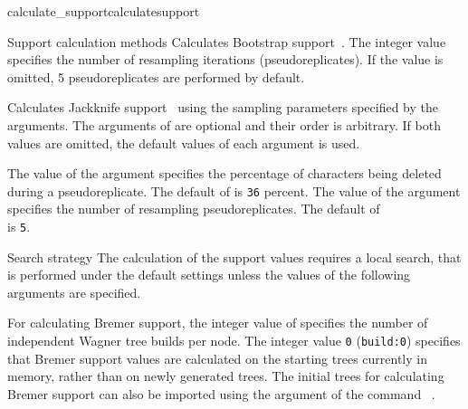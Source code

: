 \begin{command}{calculate\_support}{calculatesupport}
\begin{arguments}
\begin{argumentgroup}{Support calculation methods}
                {Calculates Bootstrap support~\cite{Felsenstein1985}. 
                The integer value specifies
                the number of resampling iterations (pseudoreplicates). If the value
                is omitted, 5 pseudoreplicates are performed by default.} 
                {}

                {Calculates Jackknife support~\cite{Farrisetal1996} using the 
                sampling parameters specified by the arguments. The arguments of
                 are optional and their order is arbitrary. If
                both values are omitted, the default values of each argument is used.}
                {}
                
                \begin{description}
                        {The value of the argument  specifies the
                        percentage of characters being deleted during a pseudoreplicate. The
                        default of  is \texttt{36} percent.}
                        {}
                        {The value of the argument  specifies the
                        number of resampling pseudoreplicates. The default of \\
                         is \texttt{5}.}
                        {}
               \end{description}  
		\end{argumentgroup}

        \begin{argumentgroup}{Search strategy}
            {The calculation of the support values requires a local search,
            that is performed under the default settings unless the values
            of the following arguments are specified.}
		 
             {For calculating Bremer support, the integer value of
              specifies the number of independent
             Wagner tree builds per node. The integer value \texttt{0}
             (\texttt{build:0}) specifies that Bremer support values are
             calculated on the starting trees currently
             in memory, rather than on newly generated trees.
             The initial trees for calculating Bremer support
             can also be imported using the argument 
             of the command ~.
             
}
\end{argumentgroup}
\end{arguments}
\end{command}
